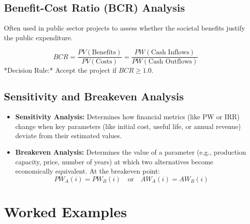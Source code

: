 \documentclass[12pt,a4paper]{article}
\begin{document}
\subsection{Benefit-Cost Ratio (BCR) Analysis}
Often used in public sector projects to assess whether the societal benefits justify the public expenditure.

\begin{tcolorbox}[formulabox, title={\textbf{Benefit-Cost Ratio Formula}}]
\begin{equation}
  BCR = \frac{PV(\text{Benefits})}{PV(\text{Costs})} = \frac{PW(\text{Cash Inflows})}{PW(\text{Cash Outflows})}
\end{equation}
*Decision Rule:* Accept the project if $BCR \ge 1.0$.
\end{tcolorbox}

\subsection{Sensitivity and Breakeven Analysis}
\begin{itemize}[leftmargin=*, itemsep=6pt]
  \item \textbf{Sensitivity Analysis:} Determines how financial metrics (like PW or IRR) change when key parameters (like initial cost, useful life, or annual revenue) deviate from their estimated values.
  \item \textbf{Breakeven Analysis:} Determines the value of a parameter (e.g., production capacity, price, number of years) at which two alternatives become economically equivalent. At the breakeven point:
    \begin{equation}
      PW_A(i) = PW_B(i) \quad \text{or} \quad AW_A(i) = AW_B(i)
    \end{equation}
\end{itemize}

\section{Worked Examples}
\end{document}
